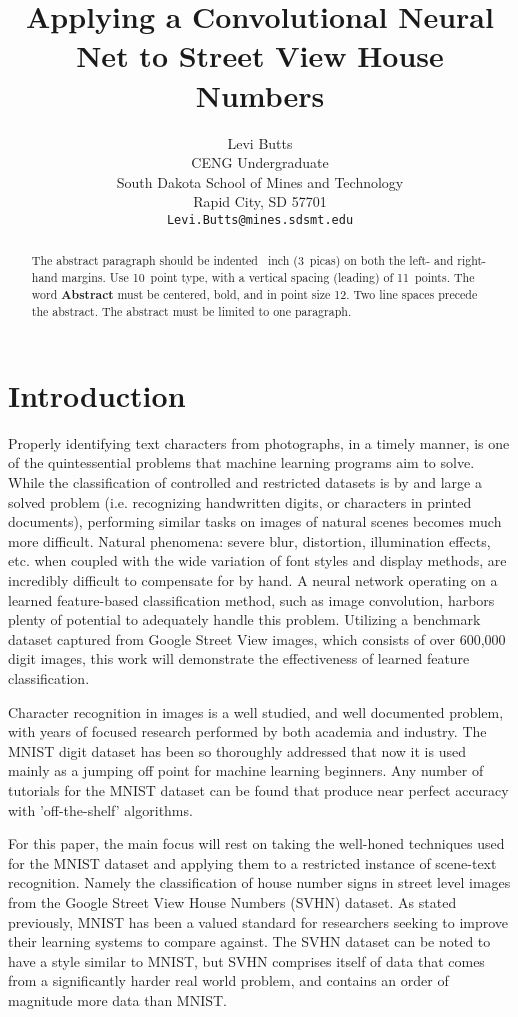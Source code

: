 \documentclass{article}
\title{Applying a Convolutional Neural Net to Street View House Numbers}
\author{
	Levi Butts\\
	CENG Undergraduate\\
	South Dakota School of Mines and Technology\\
	Rapid City, SD 57701 \\
	\texttt{Levi.Butts@mines.sdsmt.edu} \\
}
\begin{document}
	
	\maketitle
	
	\begin{abstract}
		The abstract paragraph should be indented ~inch
		(3~picas) on both the left- and right-hand margins. Use 10~point
		type, with a vertical spacing (leading) of 11~points.  The word
		\textbf{Abstract} must be centered, bold, and in point size 12. Two
		line spaces precede the abstract. The abstract must be limited to
		one paragraph.
	\end{abstract}
	
	\section{Introduction}
	
	Properly identifying text characters from photographs, in a timely manner, is one of the quintessential problems that machine learning programs aim to solve.  While the classification of controlled and restricted datasets is by and large a solved problem (i.e. recognizing handwritten digits, or characters in printed documents), performing similar tasks on images of natural scenes becomes much more difficult.  Natural phenomena: severe blur, distortion, illumination effects, etc. when coupled with the wide variation of font styles and display methods, are incredibly difficult to compensate for by hand.  A neural network operating on a learned feature-based classification method, such as image convolution, harbors plenty of potential to adequately handle this problem.   Utilizing a benchmark dataset captured from Google Street View images, which consists of over 600,000 digit images, this work will demonstrate the effectiveness of learned feature classification.
	
	Character recognition in images is a well studied, and well documented problem, with years of focused research performed by both academia and industry.  The MNIST digit dataset has been so thoroughly addressed that now it is used mainly as a jumping off point for machine learning beginners.  Any number of tutorials for the MNIST dataset can be found that produce near perfect accuracy with 'off-the-shelf' algorithms.  
	
	For this paper, the main focus will rest on taking the well-honed techniques used for the MNIST dataset and applying them to a restricted instance of scene-text recognition.  Namely the classification of house number signs in street level images from the Google Street View House Numbers (SVHN) dataset.  As stated previously, MNIST has been a valued standard for researchers seeking to improve their learning systems to compare against.  The SVHN dataset can be noted to have a style similar to MNIST, but SVHN comprises itself of data that comes from a significantly harder real world problem, and contains an order of magnitude more data than MNIST.
	
\end{document}
